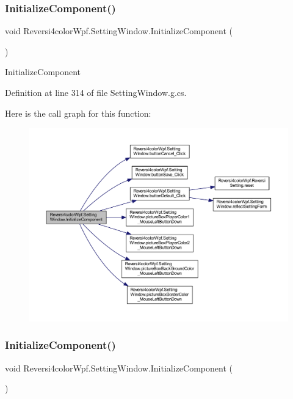\subsubsection{\texorpdfstring{Initialize\+Component()}{InitializeComponent()}\hspace{0.1cm}{\footnotesize\ttfamily [3/4]}}
{\footnotesize\ttfamily void Reversi4color\+Wpf.\+Setting\+Window.\+Initialize\+Component (\begin{DoxyParamCaption}{ }\end{DoxyParamCaption})}



Initialize\+Component 



Definition at line 314 of file Setting\+Window.\+g.\+cs.

Here is the call graph for this function\+:
\nopagebreak
\begin{figure}[H]
\begin{center}
\leavevmode
\includegraphics[width=350pt]{class_reversi4color_wpf_1_1_setting_window_ac85da370c146e04c94ae2535845b603f_cgraph}
\end{center}
\end{figure}
\mbox{\label{class_reversi4color_wpf_1_1_setting_window_ac85da370c146e04c94ae2535845b603f}} 
\subsubsection{\texorpdfstring{Initialize\+Component()}{InitializeComponent()}\hspace{0.1cm}{\footnotesize\ttfamily [4/4]}}
{\footnotesize\ttfamily void Reversi4color\+Wpf.\+Setting\+Window.\+Initialize\+Component (\begin{DoxyParamCaption}{ }\end{DoxyParamCaption})}




